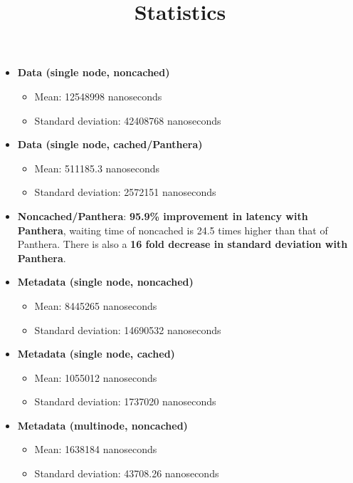 \documentclass[12pt]{article}
\begin{document}
	
	\title{Statistics}
	\date{}
	\maketitle
	\begin{itemize}
    		\item \textbf{Data (single node, noncached)}
    		\begin{itemize}
    			\item Mean: 12548998 nanoseconds
    			\item Standard deviation: 42408768 nanoseconds
    		\end{itemize}
    		\item \textbf{Data (single node, cached/Panthera)}
    		\begin{itemize}
    			\item Mean: 511185.3 nanoseconds
			\item Standard deviation: 2572151 nanoseconds
    		\end{itemize}
    		\item \textbf{Noncached/Panthera}: \textbf{95.9\% improvement in latency with Panthera}, waiting time of noncached is 24.5 times higher than that of Panthera. There is also a \textbf{16 fold decrease in standard deviation with Panthera}.
    		
    		\item \textbf{Metadata (single node, noncached)}
    		\begin{itemize}
    			\item Mean: 8445265 nanoseconds
    			\item Standard deviation: 14690532 nanoseconds
    		\end{itemize}
    		
    		\item \textbf{Metadata (single node, cached)}
    		\begin{itemize}
    			\item Mean: 1055012 nanoseconds
    			\item Standard deviation: 1737020 nanoseconds
    		\end{itemize}
    		
    		\item \textbf{Metadata (multinode, noncached)}
		\begin{itemize}
			\item Mean: 1638184 nanoseconds 
			\item Standard deviation: 43708.26 nanoseconds   		
    		\end{itemize}
    		

\end{itemize}
\end{document}

